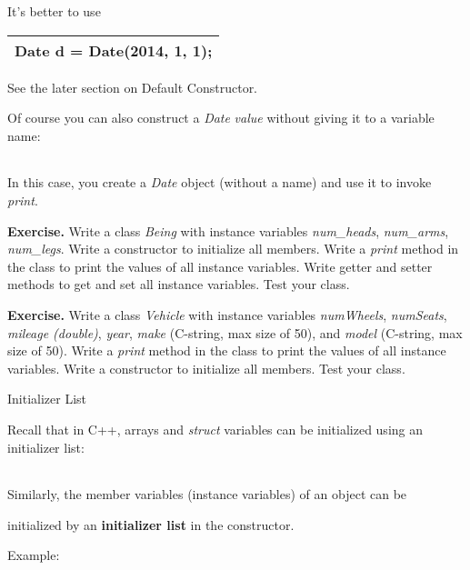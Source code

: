 \documentclass[
]{article}
\begin{document}
\begin{longtable}[]{@{}@{}}
\toprule
\endhead
\bottomrule
\end{longtable}

It's better to use

\begin{longtable}[]{@{}l@{}}
\toprule
\endhead
Date d = Date(2014, 1, 1);\tabularnewline
\bottomrule
\end{longtable}

See the later section on Default Constructor.

Of course you can also construct a \emph{Date} \emph{value} without
giving it to a variable name:

\begin{longtable}[]{@{}@{}}
\toprule
\endhead
\bottomrule
\end{longtable}

In this case, you create a \emph{Date} object (without a name) and use
it to invoke \emph{print}.

\textbf{Exercise.} Write a class \emph{Being} with instance variables
\emph{num\_heads}, \emph{num\_arms}, \emph{num\_legs}. Write a
constructor to initialize all members. Write a \emph{print} method in
the class to print the values of all instance variables. Write getter
and setter methods to get and set all instance variables. Test your
class.

\textbf{Exercise.} Write a class \emph{Vehicle} with instance variables
\emph{numWheels}, \emph{numSeats}, \emph{mileage (double)}, \emph{year},
\emph{make} (C-string, max size of 50), and \emph{model} (C-string, max
size of 50). Write a \emph{print} method in the class to print the
values of all instance variables. Write a constructor to initialize all
members. Test your class.

Initializer List

Recall that in C++, arrays and \emph{struct} variables can be
initialized using an initializer list:

\begin{longtable}[]{@{}@{}}
\toprule
\endhead
\bottomrule
\end{longtable}

Similarly, the member variables (instance variables) of an object can be

initialized by an \textbf{initializer list }in the constructor.

Example:

\begin{longtable}[]{@{}@{}}
\toprule
\endhead
\bottomrule
\end{longtable}
\end{document}
